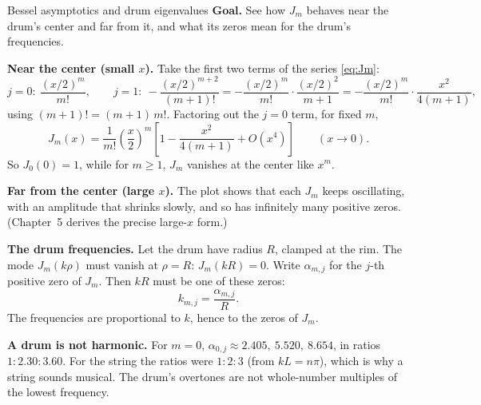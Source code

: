 \documentclass[11pt]{beamer}
\begin{document}
\begin{frame}[allowframebreaks=1.00]{Bessel asymptotics and drum eigenvalues}
\footnotesize
\textbf{Goal.} See how \(J_m\) behaves near the drum's center and far from it, and what its zeros mean
for the drum's frequencies.

\textbf{Near the center (small \(x\)).} Take the first two terms of the series \eqref{eq:Jm}:
\[
 j=0:\ \frac{(x/2)^m}{m!},\qquad
 j=1:\ -\frac{(x/2)^{m+2}}{(m+1)!}=-\frac{(x/2)^m}{m!}\cdot\frac{(x/2)^2}{m+1}=-\frac{(x/2)^m}{m!}\cdot\frac{x^2}{4(m+1)},
\]
using \((m+1)!=(m+1)\,m!\). Factoring out the \(j=0\) term, for fixed \(m\),
\[
 J_m(x)=\frac1{m!}\left(\frac{x}{2}\right)^m
 \left[1-\frac{x^2}{4(m+1)}+O(x^4)\right]\qquad(x\to0).
\]
So \(J_0(0)=1\), while for \(m\ge1\), \(J_m\) vanishes at the center like \(x^m\).

\textbf{Far from the center (large \(x\)).} The plot shows that each \(J_m\) keeps oscillating, with an
amplitude that shrinks slowly, and so has infinitely many positive zeros. (Chapter~5 derives the
precise large-\(x\) form.)
\par\framebreak\par
\textbf{The drum frequencies.} Let the drum have radius \(R\), clamped at the rim. The mode
\(J_m(k\rho)\) must vanish at \(\rho=R\): \(J_m(kR)=0\). Write \(\alpha_{m,j}\) for the \(j\)-th positive zero of
\(J_m\). Then \(kR\) must be one of these zeros:
\[
 k_{m,j}=\frac{\alpha_{m,j}}{R}.
\]
The frequencies are proportional to \(k\), hence to the zeros of \(J_m\).

\textbf{A drum is not harmonic.} For \(m=0\), \(\alpha_{0,j}\approx2.405,\ 5.520,\ 8.654\), in ratios
\(1:2.30:3.60\). For the string the ratios were \(1:2:3\) (from \(kL=n\pi\)), which is why a string sounds
musical. The drum's overtones are not whole-number multiples of the lowest frequency.
\end{frame}
\end{document}
